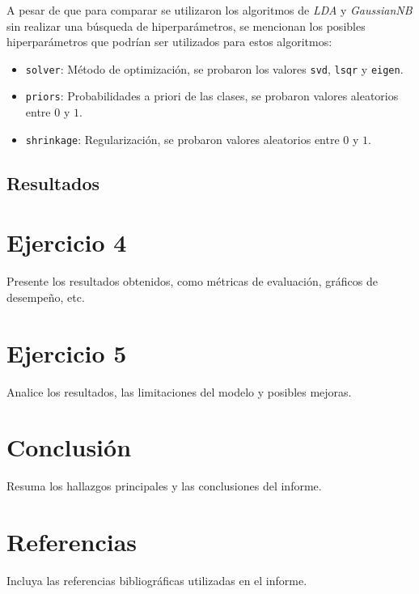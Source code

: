 \documentclass[12pt,a4paper]{article}
\begin{document}
A pesar de que para comparar se utilizaron los algoritmos de \textit{LDA} y \textit{GaussianNB} sin realizar una búsqueda de hiperparámetros, se mencionan los posibles hiperparámetros
que podrían ser utilizados para estos algoritmos:
\begin{itemize}
    \item \texttt{solver}: Método de optimización, se probaron los valores \texttt{svd}, \texttt{lsqr} y \texttt{eigen}.
    \item \texttt{priors}: Probabilidades a priori de las clases, se probaron valores aleatorios entre $0$ y $1$.
    \item \texttt{shrinkage}: Regularización, se probaron valores aleatorios entre $0$ y $1$.
\end{itemize}
\subsection{Resultados}

 \section{Ejercicio 4}
Presente los resultados obtenidos, como métricas de evaluación, gráficos de desempeño, etc.

\section{Ejercicio 5}
Analice los resultados, las limitaciones del modelo y posibles mejoras.

\section{Conclusión}
Resuma los hallazgos principales y las conclusiones del informe.

\section*{Referencias}
Incluya las referencias bibliográficas utilizadas en el informe.
\end{document}
